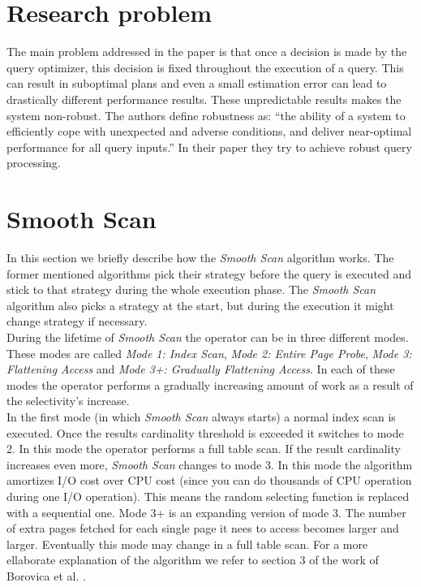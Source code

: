 \documentclass[a4paper,11pt,titlepage]{article}
\begin{document}
\section{Research problem}
The main problem addressed in the paper is that once a decision is made by the query optimizer, this decision is fixed throughout the execution of a query. This can result in suboptimal plans and even a small estimation error can lead to drastically different performance results. These unpredictable results makes the system non-robust. The authors define robustness as: “the ability of a system to efficiently cope with unexpected and adverse conditions, and deliver near-optimal performance for all query inputs.” In their paper they try to achieve robust query processing.

\section{Smooth Scan}
In this section we briefly describe how the \emph{Smooth Scan} algorithm works. The former mentioned algorithms pick their strategy before the query is executed and stick to that strategy during the whole execution phase. The \emph{Smooth Scan} algorithm also picks a strategy at the start, but during the execution it might change strategy if necessary. \\
During the lifetime of \emph{Smooth Scan} the operator can be in three different modes. These modes are called \emph{Mode 1: Index Scan}, \emph{Mode 2: Entire Page Probe}, \emph{Mode 3: Flattening Access} and \emph{Mode 3+: Gradually Flattening Access}. In each of these modes the operator performs a gradually increasing amount of work as a result of the selectivity's increase. \\
In the first mode (in which \emph{Smooth Scan} always starts) a normal index scan is executed. Once the results cardinality threshold is exceeded it switches to mode 2. In this mode the operator performs a full table scan. If the result cardinality increases even more, \emph{Smooth Scan} changes to mode 3. In this mode the algorithm amortizes I/O cost over CPU cost (since you can do thousands of CPU operation during one I/O operation). This means the random selecting function is replaced with a sequential one. Mode 3+ is an expanding version of mode 3. The number of extra pages fetched for each single page it nees to access becomes larger and larger. Eventually this mode may change in a full table scan. For a more ellaborate explanation of the algorithm we refer to section 3 of the work of Borovica et al. \cite{smoothscan}.
\end{document}
